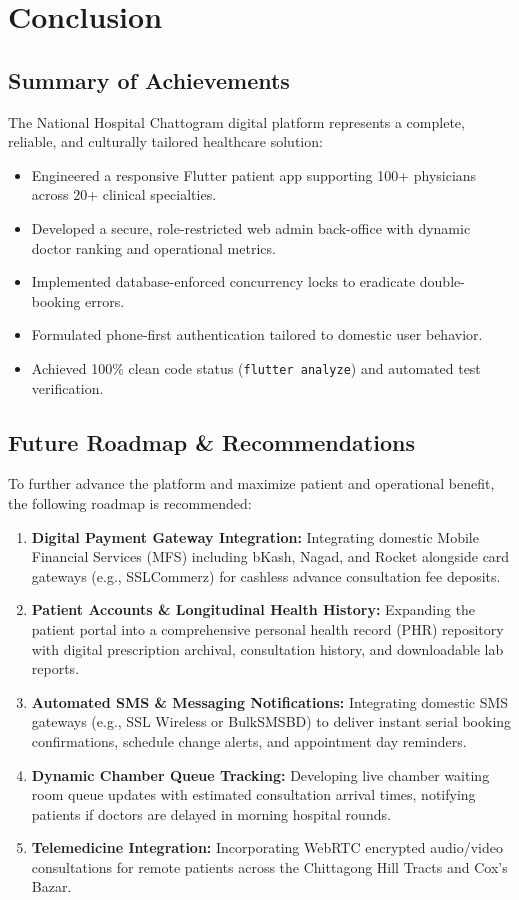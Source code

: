 \documentclass[11pt,a4paper,oneside]{report}
\begin{document}
\chapter{Conclusion}

\section{Summary of Achievements}
The National Hospital Chattogram digital platform represents a complete, reliable, and culturally tailored healthcare solution:
\begin{itemize}
    \item Engineered a responsive Flutter patient app supporting 100+ physicians across 20+ clinical specialties.
    \item Developed a secure, role-restricted web admin back-office with dynamic doctor ranking and operational metrics.
    \item Implemented database-enforced concurrency locks to eradicate double-booking errors.
    \item Formulated phone-first authentication tailored to domestic user behavior.
    \item Achieved 100\% clean code status (\texttt{flutter analyze}) and automated test verification.
\end{itemize}

\section{Future Roadmap \& Recommendations}
To further advance the platform and maximize patient and operational benefit, the following roadmap is recommended:
\begin{enumerate}
    \item \textbf{Digital Payment Gateway Integration:} Integrating domestic Mobile Financial Services (MFS) including bKash, Nagad, and Rocket alongside card gateways (e.g., SSLCommerz) for cashless advance consultation fee deposits.
    \item \textbf{Patient Accounts \& Longitudinal Health History:} Expanding the patient portal into a comprehensive personal health record (PHR) repository with digital prescription archival, consultation history, and downloadable lab reports.
    \item \textbf{Automated SMS \& Messaging Notifications:} Integrating domestic SMS gateways (e.g., SSL Wireless or BulkSMSBD) to deliver instant serial booking confirmations, schedule change alerts, and appointment day reminders.
    \item \textbf{Dynamic Chamber Queue Tracking:} Developing live chamber waiting room queue updates with estimated consultation arrival times, notifying patients if doctors are delayed in morning hospital rounds.
    \item \textbf{Telemedicine Integration:} Incorporating WebRTC encrypted audio/video consultations for remote patients across the Chittagong Hill Tracts and Cox's Bazar.
\end{enumerate}
\end{document}
